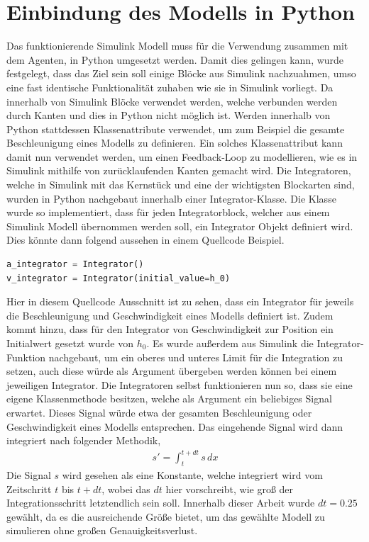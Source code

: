 \documentclass[]{iat}
\begin{document}
\section{Einbindung des Modells in Python} \label{sec:simulink_to_py}
Das funktionierende Simulink Modell muss für die Verwendung zusammen mit dem Agenten, in Python umgesetzt werden. Damit dies gelingen kann, wurde festgelegt, dass das Ziel sein soll einige Blöcke aus Simulink nachzuahmen, umso eine fast identische Funktionalität zuhaben wie sie in Simulink vorliegt. Da innerhalb von Simulink Blöcke verwendet werden, welche verbunden werden durch Kanten und dies in Python nicht möglich ist. Werden innerhalb von Python stattdessen Klassenattribute verwendet, um zum Beispiel die gesamte Beschleunigung eines Modells zu definieren. Ein solches Klassenattribut kann damit nun verwendet werden, um einen Feedback-Loop zu modellieren, wie es in Simulink mithilfe von zurücklaufenden Kanten gemacht wird. Die Integratoren, welche in Simulink mit das Kernstück und eine der wichtigsten Blockarten sind, wurden in Python nachgebaut innerhalb einer Integrator-Klasse. Die Klasse wurde so implementiert, dass für jeden Integratorblock, welcher aus einem Simulink Modell übernommen werden soll, ein Integrator Objekt definiert wird. Dies könnte dann folgend aussehen in einem Quellcode Beispiel.
\begin{lstlisting}[language=Python]
a_integrator = Integrator()
v_integrator = Integrator(initial_value=h_0)
\end{lstlisting}
Hier in diesem Quellcode Ausschnitt ist zu sehen, dass ein Integrator für jeweils die Beschleunigung und Geschwindigkeit eines Modells definiert ist. Zudem kommt hinzu, dass für den Integrator von Geschwindigkeit zur Position ein Initialwert gesetzt wurde von $h_0$. Es wurde außerdem aus Simulink die Integrator-Funktion nachgebaut, um ein oberes und unteres Limit für die Integration zu setzen, auch diese würde als Argument übergeben werden können bei einem jeweiligen Integrator. Die Integratoren selbst funktionieren nun so, dass sie eine eigene Klassenmethode besitzen, welche als Argument ein beliebiges Signal erwartet. Dieses Signal würde etwa der gesamten Beschleunigung oder Geschwindigkeit eines Modells entsprechen. Das eingehende Signal wird dann integriert nach folgender Methodik,
\begin{align}
    s' = \int_{t}^{t+dt} s \, dx
\end{align}
Die Signal $s$ wird gesehen als eine Konstante, welche integriert wird vom Zeitschritt $t$ bis $t + dt$, wobei das $dt$ hier vorschreibt, wie groß der Integrationsschritt letztendlich sein soll. Innerhalb dieser Arbeit wurde $dt = 0.25$ gewählt, da es die ausreichende Größe bietet, um das gewählte Modell zu simulieren ohne großen Genauigkeitsverlust.
\end{document}
